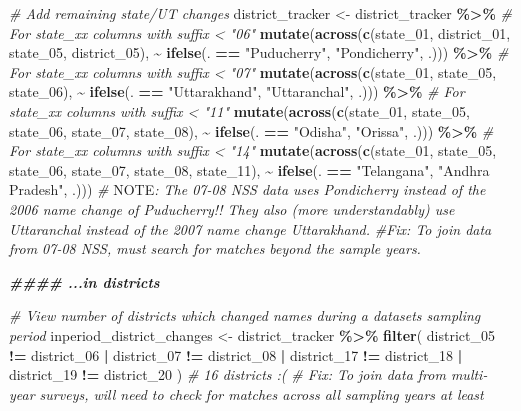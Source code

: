 \documentclass[
]{article}
\newenvironment{Shaded}{\begin{snugshade}}{\end{snugshade}}
\newcommand{\AlertTok}[1]{\textcolor[rgb]{0.94,0.16,0.16}{#1}}
\newcommand{\CommentTok}[1]{\textcolor[rgb]{0.56,0.35,0.01}{\textit{#1}}}
\newcommand{\DocumentationTok}[1]{\textcolor[rgb]{0.56,0.35,0.01}{\textbf{\textit{#1}}}}
\newcommand{\FunctionTok}[1]{\textcolor[rgb]{0.13,0.29,0.53}{\textbf{#1}}}
\newcommand{\NormalTok}[1]{#1}
\newcommand{\OtherTok}[1]{\textcolor[rgb]{0.56,0.35,0.01}{#1}}
\newcommand{\SpecialCharTok}[1]{\textcolor[rgb]{0.81,0.36,0.00}{\textbf{#1}}}
\newcommand{\StringTok}[1]{\textcolor[rgb]{0.31,0.60,0.02}{#1}}
\begin{document}
\begin{Shaded}
\begin{Highlighting}[]
\CommentTok{\# Add remaining state/UT changes}
\NormalTok{district\_tracker }\OtherTok{\textless{}{-}}\NormalTok{ district\_tracker }\SpecialCharTok{\%\textgreater{}\%}
  \CommentTok{\# For state\_xx columns with suffix \textless{} "06"}
  \FunctionTok{mutate}\NormalTok{(}\FunctionTok{across}\NormalTok{(}\FunctionTok{c}\NormalTok{(state\_01, district\_01, state\_05, district\_05), }
                \SpecialCharTok{\textasciitilde{}} \FunctionTok{ifelse}\NormalTok{(. }\SpecialCharTok{==} \StringTok{"Puducherry"}\NormalTok{, }\StringTok{"Pondicherry"}\NormalTok{, .))) }\SpecialCharTok{\%\textgreater{}\%}
  \CommentTok{\# For state\_xx columns with suffix \textless{} "07"}
  \FunctionTok{mutate}\NormalTok{(}\FunctionTok{across}\NormalTok{(}\FunctionTok{c}\NormalTok{(state\_01, state\_05, state\_06), }
                \SpecialCharTok{\textasciitilde{}} \FunctionTok{ifelse}\NormalTok{(. }\SpecialCharTok{==} \StringTok{"Uttarakhand"}\NormalTok{, }\StringTok{"Uttaranchal"}\NormalTok{, .))) }\SpecialCharTok{\%\textgreater{}\%}
  \CommentTok{\# For state\_xx columns with suffix \textless{} "11"}
  \FunctionTok{mutate}\NormalTok{(}\FunctionTok{across}\NormalTok{(}\FunctionTok{c}\NormalTok{(state\_01, state\_05, state\_06, state\_07, state\_08), }
                \SpecialCharTok{\textasciitilde{}} \FunctionTok{ifelse}\NormalTok{(. }\SpecialCharTok{==} \StringTok{"Odisha"}\NormalTok{, }\StringTok{"Orissa"}\NormalTok{, .))) }\SpecialCharTok{\%\textgreater{}\%}
  \CommentTok{\# For state\_xx columns with suffix \textless{} "14"}
  \FunctionTok{mutate}\NormalTok{(}\FunctionTok{across}\NormalTok{(}\FunctionTok{c}\NormalTok{(state\_01, state\_05, state\_06, state\_07, state\_08, state\_11), }
                \SpecialCharTok{\textasciitilde{}} \FunctionTok{ifelse}\NormalTok{(. }\SpecialCharTok{==} \StringTok{"Telangana"}\NormalTok{, }\StringTok{"Andhra Pradesh"}\NormalTok{, .)))}
\CommentTok{\# }\AlertTok{NOTE}\CommentTok{: The 07{-}08 NSS data uses Pondicherry instead of the 2006 name change of Puducherry!! They also (more understandably) use Uttaranchal instead of the 2007 name change Uttarakhand. }
\CommentTok{\#Fix: To join data from 07{-}08 NSS, must search for matches beyond the sample years.}


\DocumentationTok{\#\#\#\# ...in districts}

\CommentTok{\# View number of districts which changed names during a dataset\textquotesingle{}s sampling period}
\NormalTok{inperiod\_district\_changes }\OtherTok{\textless{}{-}}\NormalTok{ district\_tracker }\SpecialCharTok{\%\textgreater{}\%} 
  \FunctionTok{filter}\NormalTok{(}
\NormalTok{    district\_05 }\SpecialCharTok{!=}\NormalTok{ district\_06 }\SpecialCharTok{|}
\NormalTok{    district\_07 }\SpecialCharTok{!=}\NormalTok{ district\_08 }\SpecialCharTok{|}
\NormalTok{    district\_17 }\SpecialCharTok{!=}\NormalTok{ district\_18 }\SpecialCharTok{|}
\NormalTok{    district\_19 }\SpecialCharTok{!=}\NormalTok{ district\_20}
\NormalTok{  )}
\CommentTok{\# 16 districts :(}
\CommentTok{\# Fix: To join data from multi{-}year surveys, will need to check for matches across all sampling years at least}




\end{Highlighting}
\end{Shaded}
\end{document}
